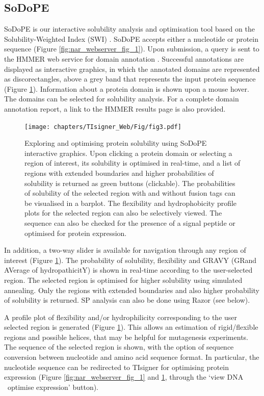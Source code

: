 \subsection{SoDoPE}

SoDoPE is our interactive solubility analysis and optimisation tool
based on the Solubility-Weighted Index (SWI)
\cite{Bhandari2020-pz}. SoDoPE accepts either
a nucleotide or protein sequence (Figure \ref{fig:nar_webserver_fig_1}). Upon submission, a query is
sent to the HMMER web service for domain annotation
\cite{Potter2018-ox}. Successful annotations
are displayed as interactive graphics, in which the annotated domains
are represented as discorectangles, above a grey band that represents
the input protein sequence (Figure \ref{fig:nar_webserver_fig_3}). Information about a protein domain is shown
upon a mouse hover. The domains can be selected for solubility
analysis. For a complete domain annotation report, a link to the HMMER
results page is also provided.

\begin{figure}[!hbtp]
\texttt{[image: chapters/TIsigner\_Web/Fig/fig3.pdf]}
\caption[Exploring and optimising protein solubility using SoDoPE interactive
graphics.]{Exploring and optimising protein solubility using SoDoPE interactive
graphics. Upon clicking a protein domain or selecting a region of
interest, its solubility is optimised in real-time, and a list of
regions with extended boundaries and higher probabilities of solubility
is returned as green buttons (clickable). The probabilities of
solubility of the selected region with and without fusion tags can be
visualised in a barplot. The flexibility and hydrophobicity profile
plots for the selected region can also be selectively viewed. The
sequence can also be checked for the presence of a signal peptide or
optimised for protein expression.}
\label{fig:nar_webserver_fig_3}
\end{figure}

In addition, a two-way slider is available for navigation through any
region of interest (Figure \ref{fig:nar_webserver_fig_3}). The probability of solubility, flexibility and GRAVY
(GRand AVerage of hydropathicitY) is shown in real-time according to the
user-selected region. The selected region is optimised for higher
solubility using simulated annealing. Only the regions with extended
boundaries and also higher probability of solubility is returned. SP
analysis can also be done using Razor (see below).

A profile plot of flexibility and/or hydrophilicity corresponding to the
user selected region is generated (Figure \ref{fig:nar_webserver_fig_3}). This allows an estimation of
rigid/flexible regions and possible helices, that may be helpful for
mutagenesis experiments. The sequence of the selected region is shown,
with the option of sequence conversion between nucleotide and amino acid
sequence format. In particular, the nucleotide sequence can be
redirected to TIsigner for optimising protein expression (Figure \ref{fig:nar_webserver_fig_1} and \ref{fig:nar_webserver_fig_3}, through the `view DNA \textbar\ optimise expression' button).

